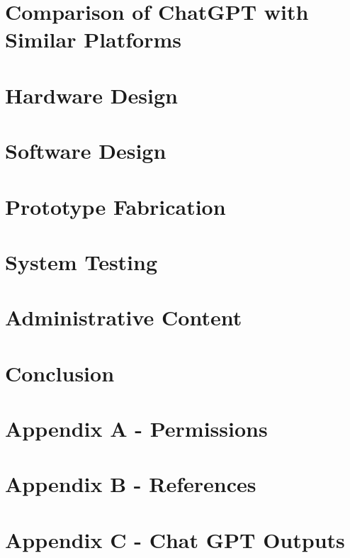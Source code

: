\documentclass[12pt, letterpaper]{article}
\begin{document}
\begin{singlespace}
	\section{Comparison of ChatGPT with Similar Platforms}
	
	
	\newpage
	\section{Hardware Design}
	
	
	
	
	
	\newpage
	\section{Software Design}
	
	
	
	
	
	\newpage
	\section{Prototype Fabrication}
	
	
	\newpage
	\section{System Testing}
	
	
	\newpage
	\section{Administrative Content}
	
	
		
	\newpage
	\section{Conclusion}
	
	\newpage
	\section{Appendix A - Permissions}
	
	
	\newpage
	\section{Appendix B - References}
	
	
	\newpage
	\section{Appendix C - Chat GPT Outputs}
	
	
	\end{singlespace}
\end{document}
